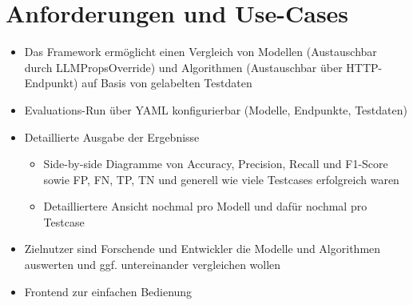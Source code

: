 \section{Anforderungen und Use-Cases}\label{sec:anforderungen-und-use-cases}

\begin{itemize}
    \item Das Framework ermöglicht einen Vergleich von Modellen (Austauschbar durch LLMPropsOverride) und Algorithmen (Austauschbar über HTTP-Endpunkt) auf Basis von gelabelten Testdaten
    \item Evaluations-Run über YAML konfigurierbar (Modelle, Endpunkte, Testdaten)
    \item Detaillierte Ausgabe der Ergebnisse
    \begin{itemize}
        \item Side-by-side Diagramme von Accuracy, Precision, Recall und F1-Score sowie FP, FN, TP, TN und generell wie viele Testcases erfolgreich waren
        \item Detailliertere Ansicht nochmal pro Modell und dafür nochmal pro Testcase
    \end{itemize}
    \item Zielnutzer sind Forschende und Entwickler die Modelle und Algorithmen auswerten und ggf. untereinander vergleichen wollen
    \item Frontend zur einfachen Bedienung
\end{itemize}